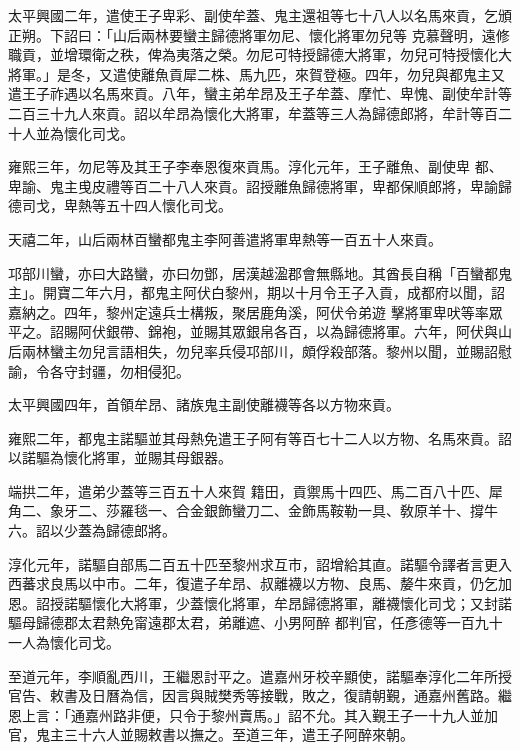 \begin{pinyinscope}
 太平興國二年，遣使王子卑彩、副使牟蓋、鬼主還祖等七十八人以名馬來貢，乞頒正朔。下詔曰：「山后兩林要蠻主歸德將軍勿尼、懷化將軍勿兒等
 克慕聲明，遠修職貢，並增環衛之秩，俾為夷落之榮。勿尼可特授歸德大將軍，勿兒可特授懷化大將軍。」是冬，又遣使離魚貢犀二株、馬九匹，來賀登極。四年，勿兒與都鬼主又遣王子祚遇以名馬來貢。八年，蠻主弟牟昂及王子牟蓋、摩忙、卑愧、副使牟計等二百三十九人來貢。詔以牟昂為懷化大將軍，牟蓋等三人為歸德郎將，牟計等百二十人並為懷化司戈。



 雍熙三年，勿尼等及其王子李奉恩復來貢馬。淳化元年，王子離魚、副使卑
 都、卑諭、鬼主曵皮禮等百二十八人來貢。詔授離魚歸德將軍，卑都保順郎將，卑諭歸德司戈，卑熱等五十四人懷化司戈。



 天禧二年，山后兩林百蠻都鬼主李阿善遣將軍卑熱等一百五十人來貢。



 邛部川蠻，亦曰大路蠻，亦曰勿鄧，居漢越溋郡會無縣地。其酋長自稱「百蠻都鬼主」。開寶二年六月，都鬼主阿伏白黎州，期以十月令王子入貢，成都府以聞，詔嘉納之。四年，黎州定遠兵士構叛，聚居鹿角溪，阿伏令弟遊
 擊將軍卑吠等率眾平之。詔賜阿伏銀帶、錦袍，並賜其眾銀帛各百，以為歸德將軍。六年，阿伏與山后兩林蠻主勿兒言語相失，勿兒率兵侵邛部川，頗俘殺部落。黎州以聞，並賜詔慰諭，令各守封疆，勿相侵犯。



 太平興國四年，首領牟昂、諸族鬼主副使離襪等各以方物來貢。



 雍熙二年，都鬼主諾驅並其母熱免遣王子阿有等百七十二人以方物、名馬來貢。詔以諾驅為懷化將軍，並賜其母銀器。



 端拱二年，遣弟少蓋等三百五十人來賀
 籍田，貢禦馬十四匹、馬二百八十匹、犀角二、象牙二、莎羅毯一、合金銀飾蠻刀二、金飾馬鞍勒一具、敎原羊十、撐牛六。詔以少蓋為歸德郎將。



 淳化元年，諾驅自部馬二百五十匹至黎州求互市，詔增給其直。諾驅令譯者言更入西蕃求良馬以中市。二年，復遣子牟昂、叔離襪以方物、良馬、嫠牛來貢，仍乞加恩。詔授諾驅懷化大將軍，少蓋懷化將軍，牟昂歸德將軍，離襪懷化司戈；又封諾驅母歸德郡太君熱免甯遠郡太君，弟離遮、小男阿醉
 都判官，任彥德等一百九十一人為懷化司戈。



 至道元年，李順亂西川，王繼恩討平之。遣嘉州牙校辛顯使，諾驅奉淳化二年所授官告、敕書及日曆為信，因言與賊樊秀等接戰，敗之，復請朝覲，通嘉州舊路。繼恩上言：「通嘉州路非便，只令于黎州賣馬。」詔不允。其入覲王子一十九人並加官，鬼主三十六人並賜敕書以撫之。至道三年，遣王子阿醉來朝。




\end{pinyinscope}
